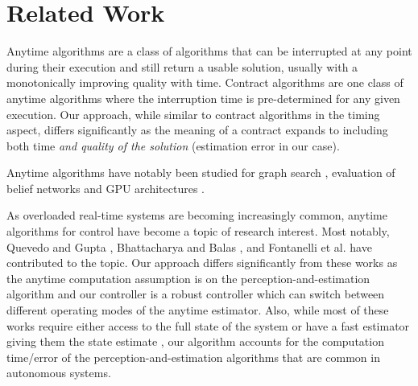 \section{Related Work}
\label{related}

Anytime algorithms \cite{boddy} are a class of algorithms that can be interrupted at any point during their execution and still return a usable solution, usually with a monotonically improving quality with time. 
Contract algorithms \cite{zilbersteinAImag} are one class of anytime algorithms where the interruption time is pre-determined for any given execution. 
Our approach, while similar to contract algorithms in the timing aspect, differs significantly as the meaning of a contract expands to including both time \emph{and quality of the solution} (estimation error in our case).

Anytime algorithms have notably been studied for graph search \cite{maxim}, evaluation of belief networks \cite{wellman} and GPU architectures \cite{RTSSanytime}.

As overloaded real-time systems are becoming increasingly common, anytime algorithms for control have become a topic of research interest. Most notably, Quevedo and Gupta \cite{sequence}, Bhattacharya and Balas \cite{balas}, and Fontanelli et al. \cite{fontanelli} have contributed to the topic. Our approach differs significantly from these works as the anytime computation assumption is on the perception-and-estimation algorithm and our controller is a robust controller which can switch between different operating modes of the anytime estimator. Also, while most of these works require either access to the full state of the system or have a fast estimator giving them the state estimate \cite{balas}, our algorithm accounts for the computation time/error of the perception-and-estimation algorithms that are common in autonomous systems.

